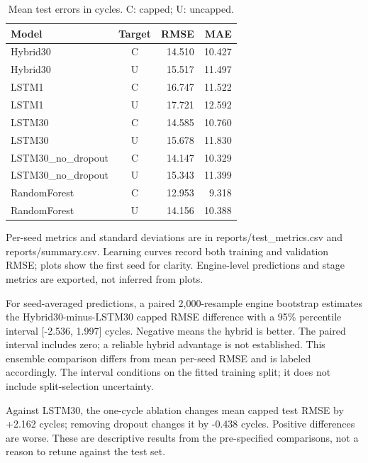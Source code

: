\documentclass[conference]{IEEEtran}
\begin{document}
\begin{table}[ht]

\centering\caption{Mean test errors in cycles. C: capped; U: uncapped.}

\begin{tabular}{lcrr}\hline Model & Target & RMSE & MAE\\\hline

Hybrid30 & C & 14.510 & 10.427 \\

Hybrid30 & U & 15.517 & 11.497 \\

LSTM1 & C & 16.747 & 11.522 \\

LSTM1 & U & 17.721 & 12.592 \\

LSTM30 & C & 14.585 & 10.760 \\

LSTM30 & U & 15.678 & 11.830 \\

LSTM30\_no\_dropout & C & 14.147 & 10.329 \\

LSTM30\_no\_dropout & U & 15.343 & 11.399 \\

RandomForest & C & 12.953 & 9.318 \\

RandomForest & U & 14.156 & 10.388 \\

\hline\end{tabular}\end{table}

Per-seed metrics and standard deviations are in reports/test\_metrics.csv and reports/summary.csv. Learning curves record both training and validation RMSE; plots show the first seed for clarity. Engine-level predictions and stage metrics are exported, not inferred from plots.

For seed-averaged predictions, a paired 2,000-resample engine bootstrap estimates the Hybrid30-minus-LSTM30 capped RMSE difference with a 95\% percentile interval [-2.536, 1.997] cycles. Negative means the hybrid is better. The paired interval includes zero; a reliable hybrid advantage is not established. This ensemble comparison differs from mean per-seed RMSE and is labeled accordingly. The interval conditions on the fitted training split; it does not include split-selection uncertainty.

Against LSTM30, the one-cycle ablation changes mean capped test RMSE by +2.162 cycles; removing dropout changes it by -0.438 cycles. Positive differences are worse. These are descriptive results from the pre-specified comparisons, not a reason to retune against the test set.
\end{document}
